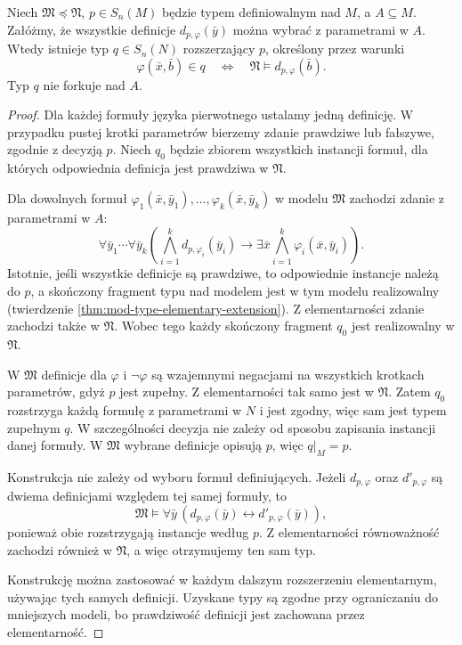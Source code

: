\begin{lemat}
\label{lem:mod-definable-extension}
Niech $\mathfrak M\preccurlyeq\mathfrak N$,
$p\in S_n(M)$ będzie typem definiowalnym nad $M$,
a $A\subseteq M$. Załóżmy, że wszystkie definicje
$d_{p,\varphi}(\bar y)$ można wybrać z parametrami
w $A$. Wtedy istnieje typ $q\in S_n(N)$
rozszerzający $p$, określony przez warunki
\[
\varphi(\bar x,\bar b)\in q
\quad\Longleftrightarrow\quad
\mathfrak N\models d_{p,\varphi}(\bar b).
\]
Typ $q$ nie forkuje nad $A$.
\end{lemat}
\begin{proof}
Dla każdej formuły języka pierwotnego
ustalamy jedną definicję. W przypadku
pustej krotki parametrów bierzemy zdanie
prawdziwe lub fałszywe, zgodnie z decyzją $p$.
Niech $q_0$ będzie zbiorem wszystkich instancji
formuł, dla których odpowiednia definicja
jest prawdziwa w $\mathfrak N$.

Dla dowolnych formuł
$\varphi_1(\bar x,\bar y_1),\ldots,
\varphi_k(\bar x,\bar y_k)$
w modelu $\mathfrak M$ zachodzi zdanie
z parametrami w $A$:
\[
\forall\bar y_1\cdots\forall\bar y_k
\left(
\bigwedge_{i=1}^{k}d_{p,\varphi_i}(\bar y_i)
\to
\exists\bar x\bigwedge_{i=1}^{k}
\varphi_i(\bar x,\bar y_i)
\right).
\]
Istotnie, jeśli wszystkie definicje są prawdziwe,
to odpowiednie instancje należą do $p$,
a skończony fragment typu nad modelem jest
w tym modelu realizowalny
(twierdzenie \ref{thm:mod-type-elementary-extension}).
Z elementarności zdanie zachodzi także
w $\mathfrak N$. Wobec tego każdy skończony
fragment $q_0$ jest realizowalny w $\mathfrak N$.

W $\mathfrak M$ definicje dla $\varphi$
i $\neg\varphi$ są wzajemnymi negacjami
na wszystkich krotkach parametrów,
gdyż $p$ jest zupełny.
Z elementarności tak samo jest w $\mathfrak N$.
Zatem $q_0$ rozstrzyga każdą formułę
z parametrami w $N$ i jest zgodny,
więc sam jest typem zupełnym $q$.
W szczególności decyzja nie zależy od sposobu
zapisania instancji danej formuły.
W $\mathfrak M$ wybrane definicje opisują $p$,
więc $q|_M=p$.

Konstrukcja nie zależy od wyboru formuł
definiujących. Jeżeli $d_{p,\varphi}$ oraz
$d'_{p,\varphi}$ są dwiema definicjami względem
tej samej formuły, to
\[
\mathfrak M\models\forall\bar y\,
(d_{p,\varphi}(\bar y)\leftrightarrow d'_{p,\varphi}(\bar y)),
\]
ponieważ obie rozstrzygają instancje według $p$.
Z elementarności równoważność zachodzi również
w $\mathfrak N$, a więc otrzymujemy ten sam typ.

Konstrukcję można zastosować w każdym dalszym
rozszerzeniu elementarnym, używając tych samych
definicji. Uzyskane typy są zgodne przy
ograniczaniu do mniejszych modeli,
bo prawdziwość definicji jest zachowana
przez elementarność.


\end{proof}

